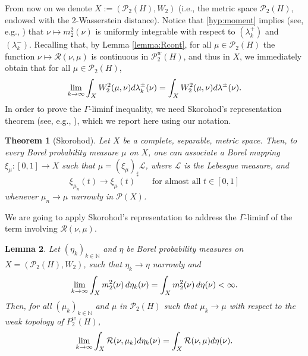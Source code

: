 \documentclass[12pt,a4paper]{article}
\newcommand{\N}{\mathbb{N}}
\renewcommand{\P}{\mathcal{P}}
\renewcommand{\d}{{\rm d}}
\newcommand{\X}{\mathcal{P}_2(H)}
\theoremstyle{plain}
\newtheorem{theorem}{Theorem}[section]
\newtheorem{lemma}[theorem]{Lemma}
\theoremstyle{definition}
\begin{document}
From now on we denote $X:=(\X,W_2)$ (i.e., the metric space $\X$, endowed with the 2-Wasserstein distance). Notice that \eqref{hyp:moment} implies (see, e.g., \cite[Lemma 6.1.5]{ambrosio-gigli-savare}) that $\nu \mapsto m_2^2(\nu)$ is uniformly integrable with respect to $(\lambda_k^+)$ and $(\lambda_k^-)$. Recalling that, by Lemma \ref{lemma:Rcont},  for all $\mu \in \X$ the function $\nu \mapsto \mathcal{R}(\nu,\mu)$ is continuous in $\P^w_2(H)$, and thus in $X$, we  immediately obtain that for all $\mu \in \X$,
\begin{equation}
\label{eq:contW}
	\lim_{k\to \infty} \int_{X} W_2^2(\mu,\nu)\d\lambda_k^{\pm}(\nu) = \int_{X} W_2^2(\mu,\nu)\d\lambda^{\pm}(\nu).
\end{equation}
In order to prove the $\Gamma$-liminf inequality, we need Skorohod's representation theorem (see, e.g., \cite[Theorem 8.5.4]{bogachev}), which we report here using our notation.
\begin{theorem}[Skorohod]
\label{th:skorohod}
Let $X$ be a complete, separable, metric space. Then, to every Borel probability measure $\mu$ on $X$, one can associate a Borel mapping $\xi_\mu: [0,1] \to X$ such that $\mu = (\xi_\mu)_\sharp \mathcal L$, where $\mathcal L$ is the Lebesgue measure, and 
\[
	\xi_{\mu_n}(t) \to 	\xi_{\mu}(t)\qquad \text{for almost all }t\in[0,1]
\]
whenever $\mu_n \to \mu$ narrowly in $\P(X)$.
\end{theorem}
We are going to apply Skorohod's representation to address the $\Gamma$-liminf of the term involving $\mathcal R(\nu,\mu)$.
\begin{lemma}
\label{lemma:gammaR}
Let $(\eta_k)_{k\in \N}$ and $\eta$ be Borel probability measures on $X=(\X,W_2)$, such that $\eta_k \to \eta$ narrowly and
\begin{equation}
\label{eq:m2conv}
	\lim_{k\to \infty} \int_{X}m_2^2(\nu)\,\d\eta_k(\nu) = \int_{X}m_2^2(\nu)\,\d\eta(\nu) < \infty.
\end{equation}
Then, for all $(\mu_k)_{k \in \N}$ and $\mu$ in $\X$ such that $\mu_k \to \mu$ with respect to the weak topology of $P_2^w(H)$,
\[
	\lim_{k \to \infty} \int_X \mathcal{R}(\nu,\mu_k)\d\eta_k(\nu) = \int_X \mathcal{R}(\nu,\mu)\d\eta(\nu).
\]
\end{lemma}
\end{document}
